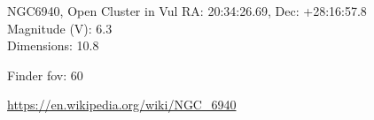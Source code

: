 \begin{block}{NGC6940, Open Cluster in Vul}
    RA: 20:34:26.69, Dec: +28:16:57.8 \\ 
    Magnitude (V): 6.3 \\ 
    Dimensions: 10.8 

    Finder fov: 60 

    \url{https://en.wikipedia.org/wiki/NGC_6940} 
\end{block}